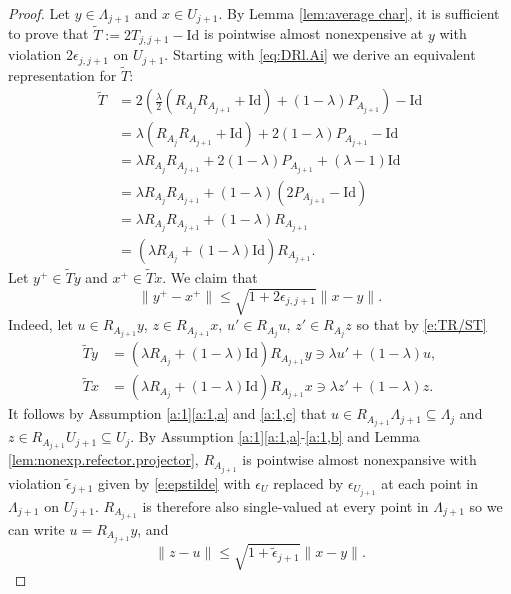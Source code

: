 \documentclass[12pt]{article}
\theoremstyle{definition}
\newcommand{\Id}{\mathrm{Id}}
\begin{document}
\begin{proof}
Let $y\in \Lambda_{j+1}$ and  $x\in U_{j+1}$.
By Lemma \ref{lem:average char}, it is sufficient to prove that $\tilde{T}:= 2T_{j,j+1}-\Id$
is pointwise almost nonexpensive at $y$ with violation $2\epsilon_{j,j+1}$ on $U_{j+1}$.
Starting with \eqref{eq:DRl.Ai} we derive an equivalent representation for
$\tilde{T}$:
\begin{align}\label{e:TR/ST}
    \tilde{T} &=2\left(\frac{\lambda}{2}(R_{A_j} R_{A_{j+1}} +\Id)+(1-\lambda)P_{A_{j+1}}  \right)-\Id\\
&=\lambda (R_{A_j} R_{A_{j+1}} +\Id) +2(1-\lambda)P_{A_{j+1}} -\Id \\
&=\lambda R_{A_j} R_{A_{j+1}} + 2(1-\lambda)P_{A_{j+1}} + (\lambda-1)\Id\\
&=\lambda R_{A_j} R_{A_{j+1}} + (1-\lambda)(2P_{A_{j+1}}-\Id)\\
&=\lambda R_{A_j} R_{A_{j+1}} + (1-\lambda)R_{A_{j+1}}\\
&=\left(\lambda R_{A_j}+ (1-\lambda)\Id\right) R_{A_{j+1}}.
\end{align}
Let $y^+\in \tilde{T}y$ and $x^+\in \tilde{T}x$. We claim that
\begin{equation}
    \|y^+-x^+\|\leq\sqrt{1+2\epsilon_{j,j+1}}\|x-y\|.
\end{equation}
Indeed, let $u\in R_{A_{j+1}}y$, $z\in R_{A_{j+1}}x$, $u'\in R_{A_j}u$, $z'\in R_{A_j}z$ so
that by \eqref{e:TR/ST}
\begin{align*}
\tilde{T}y &= \left(\lambda R_{A_j}+ (1-\lambda)\Id\right) R_{A_{j+1}}y\ni
\lambda u' + (1-\lambda)u,\\
\tilde{T}x &= \left(\lambda R_{A_j}+ (1-\lambda)\Id\right) R_{A_{j+1}}x
\ni \lambda z' + (1-\lambda)z.
\end{align*}
It follows by Assumption \ref{a:1}\eqref{a:1,a} and \eqref{a:1,c}
that $u\in R_{A_{j+1}}\Lambda_{j+1}\subseteq \Lambda_j$
and $z\in R_{A_{j+1}}U_{j+1}\subseteq U_j$.
By Assumption \ref{a:1}\eqref{a:1,a}-\eqref{a:1,b} and Lemma \ref{lem:nonexp.refector.projector}, $R_{A_{j+1}}$
is pointwise almost nonexpansive with
violation $\tilde \epsilon_{j+1}$ given by \eqref{e:epstilde} with $\epsilon_U$ replaced by
$\epsilon_{U_{j+1}}$ at each point in $\Lambda_{j+1}$ on $U_{j+1}$.  $R_{A_{j+1}}$ is therefore also single-valued
at every point in $\Lambda_{j+1}$ so we can write $u = R_{A_{j+1}}y$,  and
\begin{subequations}
\begin{equation}\label{eq:nonexp.RA2}
    \|z-u\|\leq \sqrt{1+\tilde\epsilon_{j+1}}\|x-y\|.

\end{equation}
\end{subequations}
\end{proof}
\end{document}
